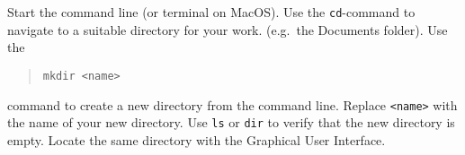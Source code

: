 Start the command line (or terminal on MacOS). Use the \texttt{cd}-command to navigate to a suitable directory for your work. (e.g.\ the Documents folder). Use the
\begin{quote}
\lstinline[language=console]{mkdir <name>}
\end{quote}
command to create a new directory from the command line. Replace \lstinline[language=console]{<name>} with the name of your new directory. Use \lstinline[language=console]{ls} or \lstinline[language=console]{dir} to verify that the new directory is empty. Locate the same directory with the Graphical User Interface.